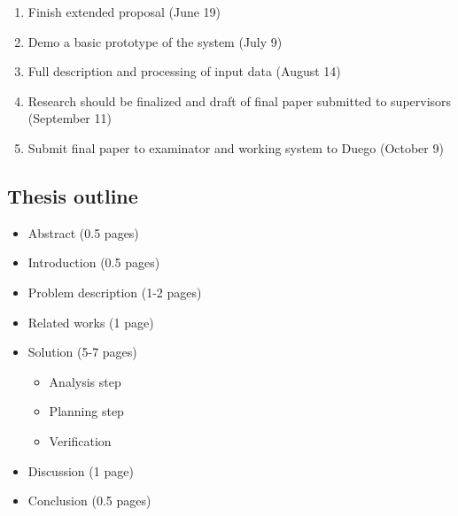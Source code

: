 \documentclass[a4paper]{article}
\begin{document}
\begin{enumerate}
	\item Finish extended proposal (June 19)
	\item Demo a basic prototype of the system (July 9)
	\item Full description and processing of input data (August 14)
	\item Research should be finalized and draft of final paper submitted to supervisors (September 11)
	\item Submit final paper to examinator and working system to Duego (October 9)
\end{enumerate}

\subsection{Thesis outline}
\begin{itemize}
	\item Abstract (0.5 pages)
 	\item Introduction (0.5 pages)
 	\item Problem description (1-2 pages)
 	\item Related works (1 page)
 	\item Solution (5-7 pages)
 	\begin{itemize}
		\item Analysis step
		\item Planning step
		\item Verification
	\end{itemize}
	\item Discussion (1 page)
	\item Conclusion (0.5 pages)
\end{itemize}


\end{document}
